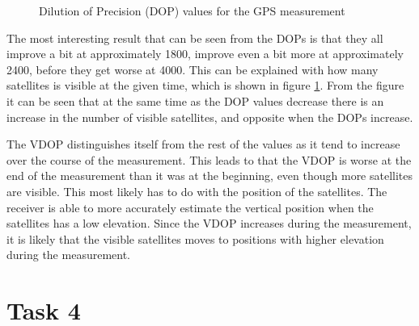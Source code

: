 \documentclass{article}
\begin{document}
\begin{figure}[!ht]
    \centering
    \caption{Dilution of Precision (DOP) values for the GPS measurement}
    \label{fig:no_satellites}
\end{figure}

The most interesting result that can be seen from the DOPs is that they all improve a bit at approximately 1800, improve even a bit more at approximately 2400, before they get worse at 4000. This can be explained with how many satellites is visible at the given time, which is shown in figure \ref{fig:no_satellites}. From the figure it can be seen that at the same time as the DOP values decrease there is an increase in the number of visible satellites, and opposite when the DOPs increase.

The VDOP distinguishes itself from the rest of the values as it tend to increase over the course of the measurement. This leads to that the VDOP is worse at the end of the measurement than it was at the beginning, even though more satellites are visible. This most likely has to do with the position of the satellites. The receiver is able to more accurately estimate the vertical position when the satellites has a low elevation. Since the VDOP increases during the measurement, it is likely that the visible satellites moves to positions with higher elevation during the measurement.


\section*{Task 4}
\end{document}
